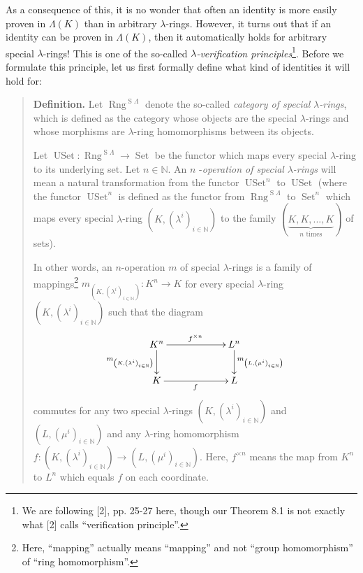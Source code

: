 \documentclass[numbers=enddot,12pt,final,onecolumn,notitlepage]{scrartcl}%
\begin{document}
As a consequence of this, it is no wonder that often an identity is more
easily proven in $\Lambda\left(  K\right)  $ than in arbitrary $\lambda
$-rings. However, it turns out that if an identity can be proven in
$\Lambda\left(  K\right)  $, then it automatically holds for arbitrary special
$\lambda$-rings! This is one of the so-called $\lambda$\textit{-verification
principles}\footnote{We are following [2], pp. 25-27 here, though our Theorem
8.1 is not exactly what [2] calls ``verification principle''.}. Before we
formulate this principle, let us first formally define what kind of identities
it will hold for:

\begin{quote}
\textbf{Definition.} Let $\operatorname*{Rng}^{\operatorname*{S}\Lambda}$
denote the so-called \textit{category of special }$\lambda$\textit{-rings},
which is defined as the category whose objects are the special $\lambda$-rings
and whose morphisms are $\lambda$-ring homomorphisms between its objects.

Let $\operatorname*{USet}:\operatorname*{Rng}^{\operatorname*{S}\Lambda
}\rightarrow\operatorname*{Set}$ be the functor which maps every special
$\lambda$-ring to its underlying set. Let $n\in\mathbb{N}$. An $n$%
-\textit{operation of special }$\lambda$\textit{-rings} will mean a natural
transformation from the functor $\operatorname*{USet}^{n}$ to
$\operatorname*{USet}$ (where the functor $\operatorname*{USet}^{n}$ is
defined as the functor from $\operatorname*{Rng}^{\operatorname*{S}\Lambda}$
to $\operatorname*{Set}^{n}$ which maps every special $\lambda$-ring $\left(
K,\left(  \lambda^{i}\right)  _{i\in\mathbb{N}}\right)  $ to the family
$\left(  \underbrace{K,K,...,K}_{n\text{ times}}\right)  $ of sets).

In other words, an $n$-operation $m$ of special $\lambda$-rings is a family of
mappings\footnote{Here, ``mapping'' actually means ``mapping'' and not ``group
homomorphism'' of ``ring homomorphism''.} $m_{\left(  K,\left(  \lambda
^{i}\right)  _{i\in\mathbb{N}}\right)  }:K^{n}\rightarrow K$ for every special
$\lambda$-ring $\left(  K,\left(  \lambda^{i}\right)  _{i\in\mathbb{N}%
}\right)  $ such that the diagram%
\begin{equation}
\xymatrixcolsep{5pc}\xymatrix{ K^n \ar[r]^{f^{\times n}} \ar[d]_{m_{\left(K,\left(\lambda^i\right)_{i\in\mathbb{N}}\right)}} & L^n \ar[d]^{m_{\left(L,\left(\mu^i\right)_{i\in\mathbb{N}}\right)}} \\ K \ar[r]_f & L }
\label{I-oper}%
\end{equation}
commutes for any two special $\lambda$-rings $\left(  K,\left(  \lambda
^{i}\right)  _{i\in\mathbb{N}}\right)  $ and $\left(  L,\left(  \mu
^{i}\right)  _{i\in\mathbb{N}}\right)  $ and any $\lambda$-ring homomorphism
$f:\left(  K,\left(  \lambda^{i}\right)  _{i\in\mathbb{N}}\right)
\rightarrow\left(  L,\left(  \mu^{i}\right)  _{i\in\mathbb{N}}\right)  $.
Here, $f^{\times n}$ means the map from $K^{n}$ to $L^{n}$ which equals $f$ on
each coordinate.
\end{quote}
\end{document}
